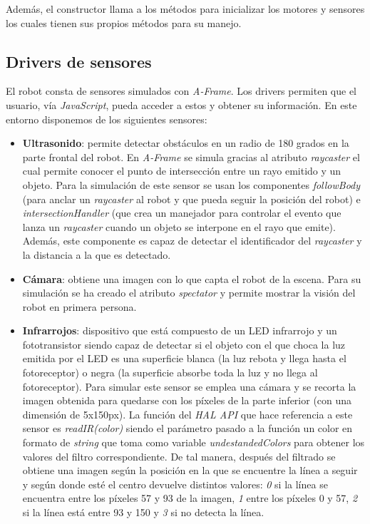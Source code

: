 Además, el constructor llama a los métodos para inicializar los motores y sensores los cuales tienen sus propios métodos para su manejo. 

\subsection{Drivers de sensores}
\label{subsec:driversSensores}
El robot consta de sensores simulados con \textit{A-Frame}. Los drivers permiten que el usuario, vía \textit{JavaScript}, pueda acceder a estos y obtener su información. En este entorno disponemos de los siguientes sensores: 

\begin{itemize}
    \item \textbf{Ultrasonido}: permite detectar obstáculos en un radio de 180 grados en la parte frontal del robot. En \textit{A-Frame} se simula gracias al atributo \textit{raycaster} el cual permite conocer el punto de intersección entre un rayo emitido y un objeto. Para la simulación de este sensor se usan los componentes \textit{followBody} (para anclar un \textit{raycaster} al robot y que pueda seguir la posición del robot) e \textit{intersectionHandler} (que crea un manejador para controlar el evento que lanza un \textit{raycaster} cuando un objeto se interpone en el rayo que emite). Además, este componente es capaz de detectar el identificador del \textit{raycaster} y la distancia a la que es detectado.
    
    \item \textbf{Cámara}: obtiene una imagen con lo que capta el robot de la escena. Para su simulación se ha creado el atributo \textit{spectator} y permite mostrar la visión del robot en primera persona. 
    
    \item \textbf{Infrarrojos}: dispositivo que está compuesto de un LED infrarrojo y un fototransistor siendo capaz de detectar si el objeto con el que choca la luz emitida por el LED es una superficie blanca (la luz rebota y llega hasta el fotoreceptor) o negra (la superficie absorbe toda la luz y no llega al fotoreceptor). 
    Para simular este sensor se emplea una cámara y se recorta la imagen obtenida para quedarse con los píxeles de la parte inferior (con una dimensión de 5x150px). La función del \textit{HAL API} que hace referencia a este sensor es \textit{readIR(color)} siendo el parámetro pasado a la función un color en formato de \textit{string} que toma como variable \textit{undestandedColors} para obtener los valores del filtro correspondiente. De tal manera, después del filtrado se obtiene una imagen según la posición en la que se encuentre la línea a seguir y según donde esté el centro devuelve distintos valores: \textit{0} si la línea se encuentra entre los píxeles 57 y 93 de la imagen, \textit{1} entre los píxeles 0 y 57, \textit{2} si la línea está entre 93 y 150 y \textit{3} si no detecta la línea.
    

\end{itemize}
